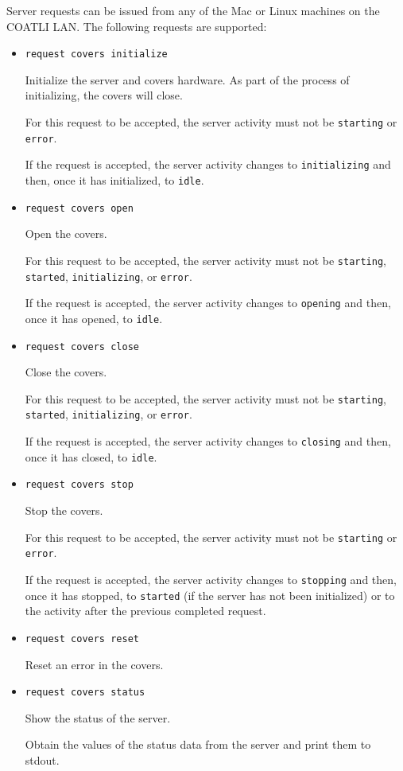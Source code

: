 Server requests can be issued from any of the Mac or Linux machines on the COATLI LAN. The following requests are supported:

\begin{itemize}
\item
\verb|request covers initialize|

Initialize the server and covers hardware. As part of the process of initializing, the covers will close.

For this request to be accepted, the server activity must not be \verb|starting| or \verb|error|.

If the request is accepted, the server activity changes to \verb|initializing| and then, once it has initialized, to \verb|idle|.

\item
\verb|request covers open|

Open the covers.

For this request to be accepted, the server activity must not be \verb|starting|, \verb|started|, \verb|initializing|, or \verb|error|.

If the request is accepted, the server activity changes to \verb|opening| and then, once it has opened, to \verb|idle|.

\item
\verb|request covers close|

Close the covers.

For this request to be accepted, the server activity must not be \verb|starting|, \verb|started|, \verb|initializing|, or \verb|error|.

If the request is accepted, the server activity changes to \verb|closing| and then, once it has closed, to \verb|idle|.

\item
\verb|request covers stop|

Stop the covers.

For this request to be accepted, the server activity must not be \verb|starting| or \verb|error|.

If the request is accepted, the server activity changes to \verb|stopping| and then, once it has stopped, to \verb|started| (if the server has not been initialized) or to the activity after the previous completed request.

\item
\verb|request covers reset|

Reset an error in the covers.

\item
\verb|request covers status|

Show the status of the server.

Obtain the values of the status data from the server and print them to stdout.
\end{itemize}

